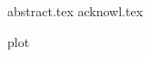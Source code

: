 \documentclass[
12pt, %
oneside,
russian, english,
singlespacing, %
headsepline, %
]{thesis} %
\begin{document}
\dominitoc[n]



\frontmatter %
\pagestyle{plain}

\if{}



{abstract.tex}
{acknowl.tex}
\fi

\setcounter{tocdepth}{1} %
\tableofcontents %




\mainmatter %
\pagestyle{thesis}

\if{}
\setcounter{mtc}{0} %
\fi
\if{}
\setcounter{mtc}{2} %
\fi

{plot}

\end{document}
